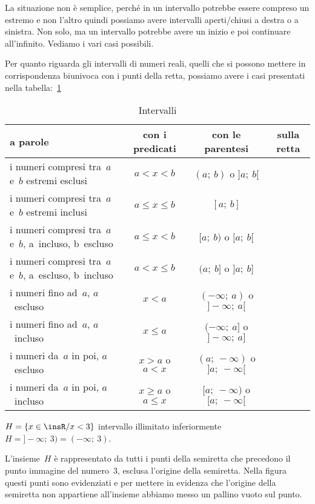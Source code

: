 La situazione non è semplice, perché in un intervallo potrebbe essere compreso
un estremo e non l'altro quindi possiamo avere intervalli aperti/chiusi
a destra o a sinistra. Non solo, ma un intervallo potrebbe avere un inizio
e poi continuare all'infinito. Vediamo i vari casi possibili.

Per quanto riguarda gli intervalli di numeri reali, quelli che si possono
mettere in corrispondenza biunivoca con i punti della retta, possiamo avere
i casi presentati nella tabella:~\ref{tab:intervalli}

\begin{table}[h!]
\caption{Intervalli}
\center
\label{tab:intervalli}
 \begin{tabular}{p{4cm}|c|c|c}
  a parole   & con i predicati & con le parentesi & sulla retta \\
  \hline
  i numeri compresi tra~$a$ e~$b$ estremi esclusi &
  $a < x < b$ & $(a;~b)$ o $]a;~b[$ &
   \\
  \hline
  i numeri compresi tra~$a$ e~$b$ estremi inclusi &
  $a \le x \le b$ & $[a;~b]$ &
   \\
  \hline
  i numeri compresi tra~$a$ e~$b$, a~incluso, b~escluso &
  $a \le x < b$ & $[a;~b)$ o $[a;~b[$ &
   \\
  \hline
  i numeri compresi tra~$a$ e~$b$, a~escluso, b~incluso &
  $a < x \le b$ & $(a;~b]$ o $]a;~b]$ &
   \\
  \hline
  i numeri fino ad~$a$, $a$~escluso &
  $x < a$ & $(-\infty;~a)$ o $]-\infty;~a[$ &
   \\
  \hline
  i numeri fino ad~$a$, $a$~incluso &
  $x \le a$ & $(-\infty;~a]$ o $]-\infty;~a]$ &
   \\
  \hline
  i numeri da~$a$ in poi, $a$~escluso &
  $x > a$ o $a < x$ & $(a;~-\infty)$ o $]a;~-\infty[$ &
   \\
  \hline
  i numeri da~$a$ in poi, $a$~incluso &
  $x \ge a$ o $a \le x$ & $[a;~-\infty)$ o $[a;~-\infty[$ &
  
 \end{tabular}
\end{table}

\begin{esempio}
$H=\{x\in \insR/x<3\}$ intervallo illimitato
inferiormente~$H = ]-\infty;~3) = (-\infty;~3)$.

L'insieme~$H$ è rappresentato da tutti i punti della
semiretta che precedono il punto immagine del numero~3, esclusa
l'origine della semiretta. Nella figura questi punti sono evidenziati e
per mettere in evidenza che l'origine della semiretta non
appartiene all'insieme abbiamo messo un pallino vuoto sul punto.
\begin{center}
 
\end{center}
\end{esempio}

